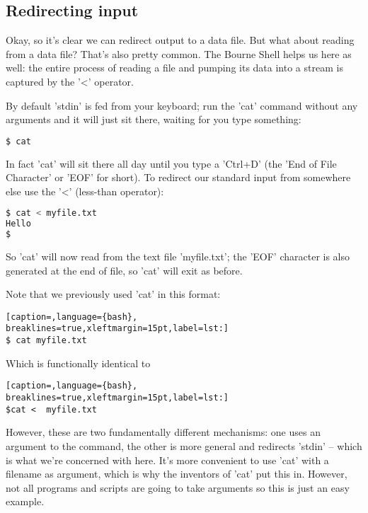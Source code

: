 \subsection{Redirecting input}
Okay, so it's clear we can redirect output to a data file. But what about
reading from a data file? That's also pretty common. The Bourne Shell helps us
here as well: the entire process of reading a file and pumping its data into a
stream is captured by the '\textless{}' operator.

By default 'stdin' is fed from your keyboard; run the 'cat' command without any
arguments and it will just sit there, waiting for you type something:


\lstset{basicstyle=\scriptsize, numbers=left, captionpos=b, tabsize=4}
\begin{lstlisting}[caption=cat ???,language={bash},
breaklines=true,xleftmargin=15pt,label=lst:cat]
$ cat
\end{lstlisting}

In fact 'cat' will sit there all day until you type a 'Ctrl+D' (the 'End of
File Character' or 'EOF' for short). To redirect our standard input from
somewhere else use the '\textless{}' (less-than operator):
\lstset{basicstyle=\scriptsize, numbers=left, captionpos=b, tabsize=4}
\begin{lstlisting}[caption=Redirecting into the standard input,language={bash},
breaklines=true,xleftmargin=15pt,label=lst:Redirecting into the standard input]
$ cat < myfile.txt
Hello
$
\end{lstlisting}

So 'cat' will now read from the text file 'myfile.txt'; the 'EOF' character is
also generated at the end of file, so 'cat' will exit as before.

Note that we previously used 'cat' in this format:
\lstset{basicstyle=\scriptsize, numbers=left, captionpos=b, tabsize=4}
\begin{lstlisting}[caption=,language={bash},
breaklines=true,xleftmargin=15pt,label=lst:]
$ cat myfile.txt
\end{lstlisting}

Which is functionally identical to 
\lstset{basicstyle=\scriptsize, numbers=left, captionpos=b, tabsize=4}
\begin{lstlisting}[caption=,language={bash},
breaklines=true,xleftmargin=15pt,label=lst:]
$cat <  myfile.txt
\end{lstlisting}

However, these are two fundamentally different mechanisms: one uses an argument
to the command, the other is more general and redirects 'stdin' -- which is
what we're concerned with here. It's more convenient to use 'cat' with a
filename as argument, which is why the inventors of 'cat' put this in. However,
not all programs and scripts are going to take arguments so this is just an
easy example.


